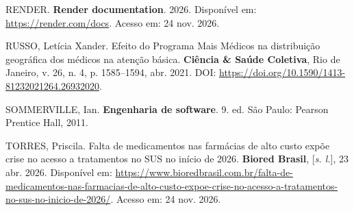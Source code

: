\documentclass[12pt,a4paper]{article}
\begin{document}
RENDER. \textbf{Render documentation}. 2026. Disponível em: \url{https://render.com/docs}. Acesso em: 24 nov. 2026.

RUSSO, Letícia Xander. Efeito do Programa Mais Médicos na distribuição geográfica dos médicos na atenção básica. \textbf{Ciência \& Saúde Coletiva}, Rio de Janeiro, v. 26, n. 4, p. 1585--1594, abr. 2021. DOI: \url{https://doi.org/10.1590/1413-81232021264.26932020}.

SOMMERVILLE, Ian. \textbf{Engenharia de software}. 9. ed. São Paulo: Pearson Prentice Hall, 2011.

TORRES, Priscila. Falta de medicamentos nas farmácias de alto custo expõe crise no acesso a tratamentos no SUS no início de 2026. \textbf{Biored Brasil}, [\textit{s. l.}], 23 abr. 2026. Disponível em: \url{https://www.bioredbrasil.com.br/falta-de-medicamentos-nas-farmacias-de-alto-custo-expoe-crise-no-acesso-a-tratamentos-no-sus-no-inicio-de-2026/}. Acesso em: 24 nov. 2026.

\endgroup
\end{document}
